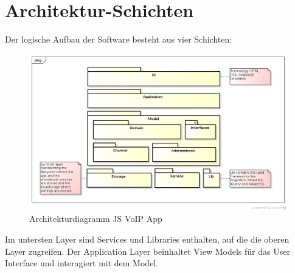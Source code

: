 \section{Architektur-Schichten}
	Der logische Aufbau der Software besteht aus vier Schichten:
	\begin{figure}[H]
		\centering
		\includegraphics[width=1\textwidth]{../architekturanalayse/img/architecture.png}
		\caption{Architekturdiagramm JS VoIP App}
	\end{figure}
	Im untersten Layer sind Services und Libraries enthalten, auf die die oberen Layer zugreifen.
	Der Application Layer beinhaltet View Models für das User Interface und interagiert mit dem Model. 

